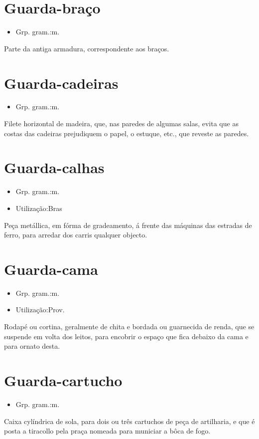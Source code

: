 \section{Guarda-braço}
\begin{itemize}
\item {Grp. gram.:m.}
\end{itemize}
Parte da antiga armadura, correspondente aos braços.
\section{Guarda-cadeiras}
\begin{itemize}
\item {Grp. gram.:m.}
\end{itemize}
Filete horizontal de madeira, que, nas paredes de algumas salas, evita que as costas das cadeiras prejudiquem o papel, o estuque, etc., que reveste as paredes.
\section{Guarda-calhas}
\begin{itemize}
\item {Grp. gram.:m.}
\end{itemize}
\begin{itemize}
\item {Utilização:Bras}
\end{itemize}
Peça metállica, em fórma de gradeamento, á frente das máquinas das estradas de ferro, para arredar dos carris qualquer objecto.
\section{Guarda-cama}
\begin{itemize}
\item {Grp. gram.:m.}
\end{itemize}
\begin{itemize}
\item {Utilização:Prov.}
\end{itemize}
Rodapé ou cortina, geralmente de chita e bordada ou guarnecida de renda, que se suspende em volta dos leitos, para encobrir o espaço que fica debaixo da cama e para ornato desta.
\section{Guarda-cartucho}
\begin{itemize}
\item {Grp. gram.:m.}
\end{itemize}
Caixa cylíndrica de sola, para dois ou três cartuchos de peça de artilharia, e que é posta a tiracollo pela praça nomeada para municiar a bôca de fogo.
